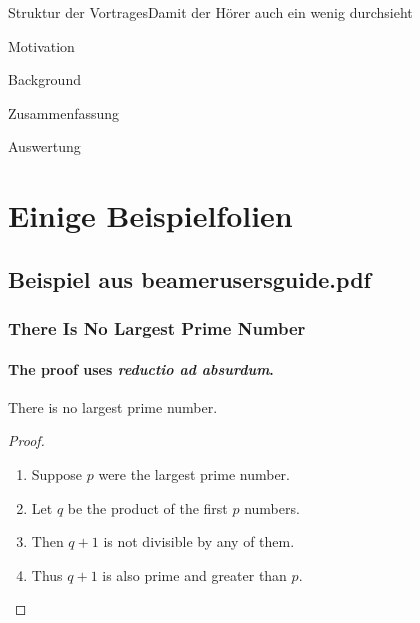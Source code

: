 \documentclass[10pt]{beamer} %
\title{}
\subtitle{Master Verteidigung}
\author{\textsc{Tom Meyer}}
\date{}
\institute{Universität Rostock, Institut für Informatik}
\begin{document}
\begin{frame}%
  \titlepage
\end{frame}

\begin{frame}{Struktur der Vortrages}{Damit der H\"orer auch ein wenig durchsieht}
  \tableofcontents[pausesections]
\end{frame}

\begin{frame}{Motivation}
\end{frame}

\begin{frame}{Background}
\end{frame}

\begin{frame}{Zusammenfassung}
  
\end{frame}

\begin{frame}{Auswertung}
  
\end{frame}


\section{Einige Beispielfolien}


\subsection{Beispiel aus beamerusersguide.pdf}
\begin{frame}
  \frametitle{There Is No Largest Prime Number}
  \framesubtitle{The proof uses \textit{reductio ad absurdum}.}
  \begin{theorem}
    There is no largest prime number.
  \end{theorem}
  \begin{proof}
    \begin{enumerate}
    \item<1-| alert@1> Suppose $p$ were the largest prime number.
    \item<2-> Let $q$ be the product of the first $p$ numbers.
    \item<3-> Then $q+1$ is not divisible by any of them.
    \item<1-> Thus $q+1$ is also prime and greater than $p$.\qedhere
    \end{enumerate}
  \end{proof}
\end{frame}
\end{document}
